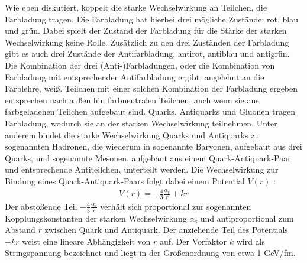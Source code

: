 Wie eben diskutiert, koppelt die starke Wechselwirkung an Teilchen, die Farbladung tragen.
Die Farbladung hat hierbei drei m\"ogliche Zust\"ande: rot, blau und gr\"un.
Dabei spielt der Zustand der Farbladung f\"ur die St\"arke der starken Wechselwirkung keine Rolle.
Zus\"atzlich zu den drei Zust\"anden der Farbladung gibt es auch drei Zust\"ande der Antifarbladung, antirot, antiblau und antigr\"un.
\newline
Die Kombination der drei (Anti-)Farbladungen, oder die Kombination von Farbladung mit entsprechender Antifarbladung ergibt, angelehnt an die Farblehre, wei{\ss}.
Teilchen mit einer solchen Kombination der Farbladung ergeben entsprechen nach au{\ss}en hin farbneutralen Teilchen, auch wenn sie aus farbgeladenen Teilchen aufgebaut sind.
\newline
Quarks, Antiquarks und Gluonen tragen Farbladung, wodurch sie an der starken Wechselwirkung teilnehmen.
Unter anderem bindet die starke Wechselwirkung Quarks und Antiquarks zu sogenannten Hadronen, die wiederum in sogenannte Baryonen, aufgebaut aus drei Quarks, und sogenannte Mesonen, aufgebaut aus einem Quark-Antiquark-Paar und entsprechende Antiteilchen, unterteilt werden.
\newline
Die Wechselwirkung zur Bindung eines Quark-Antiquark-Paars folgt dabei einem Potential $V(r)$ \cite{script:kt1}:
\begin{align} \label{eq:Potential}
V(r) = -\frac{4}{3}\frac{\alpha_\text{s}}{r} + kr 
\end{align}
Der absto{\ss}ende Teil $-\frac{4}{3}\frac{\alpha_\text{s}}{r}$ verh\"alt sich proportional zur sogenannten Kopplungskonstanten der starken Wechselwirkung $\alpha_{\text{s}}$ und antiproportional zum Abstand $r$ zwischen Quark und Antiquark.
\newline
Der anziehende Teil des Potentials $+kr$ weist eine lineare Abh\"angigkeit von $r$ auf.
Der Vorfaktor $k$ wird als Stringspannung bezeichnet und liegt in der Gr\"o{\ss}enordnung von etwa 1 GeV/fm.
